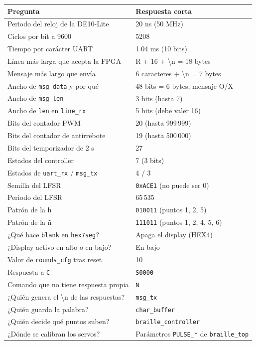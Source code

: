 \documentclass[11pt,a4paper]{article}
\newcommand{\cod}[1]{\texttt{#1}}
\begin{document}
\begin{longtable}{p{8.2cm} p{7cm}}
\toprule
\textbf{Pregunta} & \textbf{Respuesta corta} \\
\midrule
\endhead
Periodo del reloj de la DE10-Lite & 20 ns (50 MHz) \\
Ciclos por bit a 9600 & 5208 \\
Tiempo por carácter UART & 1.04 ms (10 bits) \\
Línea más larga que acepta la FPGA & R + 16 + \textbackslash n = 18 bytes \\
Mensaje más largo que envía & 6 caracteres + \textbackslash n = 7 bytes \\
Ancho de \cod{msg\_data} y por qué & 48 bits = 6 bytes, mensaje O/X \\
Ancho de \cod{msg\_len} & 3 bits (hasta 7) \\
Ancho de \cod{len} en \cod{line\_rx} & 5 bits (debe valer 16) \\
Bits del contador PWM & 20 (hasta 999\,999) \\
Bits del contador de antirrebote & 19 (hasta 500\,000) \\
Bits del temporizador de 2 s & 27 \\
Estados del controller & 7 (3 bits) \\
Estados de \cod{uart\_rx} / \cod{msg\_tx} & 4 / 3 \\
Semilla del LFSR & \cod{0xACE1} (no puede ser 0) \\
Periodo del LFSR & 65\,535 \\
Patrón de la \cod{h} & \cod{010011} (puntos 1, 2, 5) \\
Patrón de la ñ & \cod{111011} (puntos 1, 2, 4, 5, 6) \\
¿Qué hace \cod{blank} en \cod{hex7seg}? & Apaga el display (HEX4) \\
¿Display activo en alto o en bajo? & En bajo \\
Valor de \cod{rounds\_cfg} tras reset & 10 \\
Respuesta a \cod{C} & \cod{S0000} \\
Comando que no tiene respuesta propia & \cod{N} \\
¿Quién genera el \textbackslash n de las respuestas? & \cod{msg\_tx} \\
¿Quién guarda la palabra? & \cod{char\_buffer} \\
¿Quién decide qué puntos suben? & \cod{braille\_controller} \\
¿Dónde se calibran los servos? & Parámetros \cod{PULSE\_*} de \cod{braille\_top} \\
\bottomrule
\end{longtable}
\end{document}
